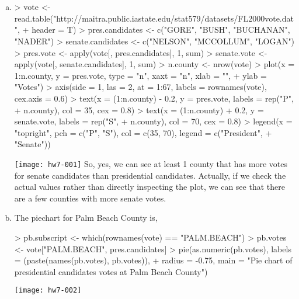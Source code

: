 \documentclass{article}
\begin{document}
\section{}
\begin{enumerate}[(a)]
    \item 
\begin{Schunk}
\begin{Sinput}
> vote <- read.table("http://maitra.public.iastate.edu/stat579/datasets/FL2000vote.dat", 
+     header = T)
> pres.candidates <- c("GORE", "BUSH", "BUCHANAN", "NADER")
> senate.candidates <- c("NELSON", "MCCOLLUM", "LOGAN")
> pres.vote <- apply(vote[, pres.candidates], 1, sum)
> senate.vote <- apply(vote[, senate.candidates], 1, sum)
> n.county <- nrow(vote)
> plot(x = 1:n.county, y = pres.vote, type = "n", xaxt = "n", xlab = "", 
+     ylab = "Votes")
> axis(side = 1, las = 2, at = 1:67, labels = rownames(vote), cex.axis = 0.6)
> text(x = (1:n.county) - 0.2, y = pres.vote, labels = rep("P", 
+     n.county), col = 35, cex = 0.8)
> text(x = (1:n.county) + 0.2, y = senate.vote, labels = rep("S", 
+     n.county), col = 70, cex = 0.8)
> legend(x = "topright", pch = c("P", "S"), col = c(35, 70), legend = c("President", 
+     "Senate"))
\end{Sinput}
\end{Schunk}
\texttt{[image: hw7-001]}
        So, yes, we can see at least 1 county that has more votes for senate candidates than presidential candidates. Actually, if we check the actual values rather than directly inspecting the plot, we can see that there are a few counties with more senate votes.
    \item The piechart for Palm Beach County is,
\begin{Schunk}
\begin{Sinput}
> pb.subscript <- which(rownames(vote) == "PALM.BEACH")
> pb.votes <- vote["PALM.BEACH", pres.candidates]
> pie(as.numeric(pb.votes), labels = (paste(names(pb.votes), pb.votes)), 
+     radius = -0.75, main = "Pie chart of presidential candidates votes at Palm Beach County")
\end{Sinput}
\end{Schunk}
\texttt{[image: hw7-002]}


\end{enumerate}
\end{document}

